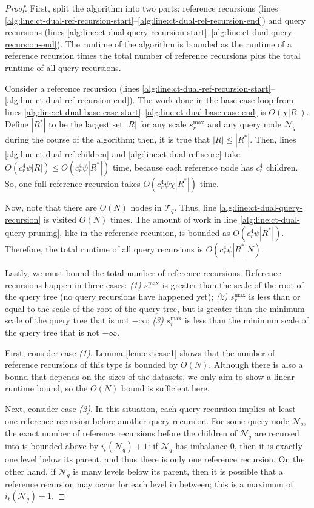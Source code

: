 \begin{proof}
First, split the algorithm into two parts: reference recursions (lines
\ref{alg:line:ct-dual-ref-recursion-start}--\ref{alg:line:ct-dual-ref-recursion-end})
and query recursions (lines
\ref{alg:line:ct-dual-query-recursion-start}--\ref{alg:line:ct-dual-query-recursion-end}).
The runtime of the algorithm is bounded as the runtime of a reference recursion
times the total number of reference recursions plus the total runtime of all
query recursions.

Consider a reference recursion (lines
\ref{alg:line:ct-dual-ref-recursion-start}--\ref{alg:line:ct-dual-ref-recursion-end}).
The work done in the base case loop from lines
\ref{alg:line:ct-dual-base-case-start}--\ref{alg:line:ct-dual-base-case-end} is
$O(\chi | R |)$.  Define $| R^* |$ to be the largest set $|R|$ for any scale
$s_r^{\max}$ and any query node $\mathscr{N}_q$ during the course of the
algorithm; then, it is true that $| R | \le | R^* |$.
%
Then, lines \ref{alg:line:ct-dual-ref-children} and
\ref{alg:line:ct-dual-ref-score} take $O(c_r^4 \psi | R |) \le O(c_r^4 \psi |
R^* |)$ time, because each reference node has $c_r^4$ children.  So, one
full reference recursion takes $O(c_r^4 \psi \chi | R^* |)$ time.

Now, note that there are $O(N)$ nodes in $\mathscr{T}_q$.  Thus, line
\ref{alg:line:ct-dual-query-recursion} is visited $O(N)$ times.  The amount of
work in line \ref{alg:line:ct-dual-query-pruning}, like in the reference
recursion, is bounded as $O(c_r^4 \psi | R^* |)$. Therefore, the total
runtime of all query recursions is $O(c_r^4 \psi | R^* | N)$.

Lastly, we must bound the total number of reference recursions.  Reference
recursions happen in three cases: \textit{(1)} $s_r^{\max}$ is greater than the
scale of the root of the query tree (no query recursions have happened yet);
\textit{(2)} $s_r^{\max}$ is less than or equal to the scale of the root of the
query tree, but is greater than the minimum scale of the query tree that is not
$-\infty$; \textit{(3)} $s_r^{\max}$ is less than the minimum scale of the query
tree that is not $-\infty$.

First, consider case \textit{(1)}.  Lemma \ref{lem:extcase1} shows that the
number of reference recursions of this type is bounded by $O(N)$.  Although
there is also a bound that depends on the sizes of the datasets, we only aim to
show a linear runtime bound, so the $O(N)$ bound is sufficient here.

Next, consider case \textit{(2)}.  In this situation, each query recursion
implies at least one reference recursion before another query recursion.  For
some query node $\mathscr{N}_q$, the exact number of reference recursions before
the children of $\mathscr{N}_q$ are recursed into is bounded above by
$i_t(\mathscr{N}_q) + 1$: if $\mathscr{N}_q$ has imbalance $0$, then it is
exactly one level below its parent, and thus there is only one reference
recursion.  On the other hand, if $\mathscr{N}_q$ is many levels below its
parent, then it is possible that a reference recursion may occur for each level
in between; this is a maximum of $i_t(\mathscr{N}_q) + 1$.


\end{proof}
